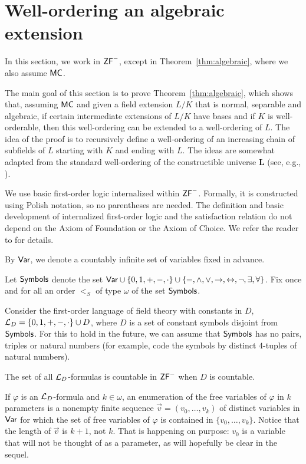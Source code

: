 \section{Well-ordering an algebraic extension}\label{sec:extension}

In this section, we work in $\mathsf{ZF}^{-}$, except in Theorem~\ref{thm:algebraic}, where we also assume $\mathsf{MC}$.

The main goal of this section is to prove Theorem~\ref{thm:algebraic}, which shows that, assuming $\mathsf{MC}$ and given a field extension $L/K$ that is normal, separable and algebraic, if certain intermediate extensions of $L/K$ have bases and if $K$ is well-orderable, then this well-ordering can be extended to a well-ordering of $L$.
The idea of the proof is to recursively define a well-ordering of an increasing chain of subfields of $L$ starting with $K$ and ending with $L$.
The ideas are somewhat adapted from the standard well-ordering of the constructible universe $\mathbf L$ (see, e.g., \cite[Definitions~II.6.18 and~II.6.19 and Theorem~II.6.20]{Kunen2011}).

We use basic first-order logic internalized within $\mathsf{ZF}^{-}$.
Formally, it is constructed using Polish notation, so no parentheses are needed.
The definition and basic development of internalized first-order logic and the satisfaction relation do not depend on the Axiom of Foundation or the Axiom of Choice.
We refer the reader to \cite[\S\S II.4--II.8]{Kunen2009} for details.

By $\mathsf{Var}$, we denote a countably infinite set of variables fixed in advance.

Let $\mathsf{Symbols}$ denote the set $\mathsf{Var}\cup\{0,1,+,-,\cdot\}\cup\{=,\land, \vee, \rightarrow, \leftrightarrow, \neg, \exists, \forall\}$.
Fix once and for all an order $<_S$ of type $\omega$ of the set $\mathsf{Symbols}$.

Consider the first-order language of field theory with constants in $D$, $\mathcal L_D=\{0,1,+,-,\cdot\}\cup D$, where $D$ is a set of constant symbols disjoint from $\mathsf{Symbols}$.
For this to hold in the future, we can assume that $\mathsf{Symbols}$ has no pairs, triples or natural numbers (for example, code the symbols by distinct $4$-tuples of natural numbers).

The set of all $\mathcal L_D$-formulas is countable in $\mathsf{ZF}^{-}$ when $D$ is countable.

If $\varphi$ is an $\mathcal L_D$-formula and $k \in \omega$, an enumeration of the free variables of $\varphi$ in $k$ parameters is a nonempty finite sequence $\vec v=(v_0,\ldots,v_k)$ of distinct variables in $\mathsf{Var}$ for which the set of free variables of $\varphi$ is contained in $\{v_0,\ldots,v_{k}\}$.
Notice that the length of $\vec v$ is $k+1$, not $k$.
That is happening on purpose: $v_0$ is a variable that will not be thought of as a parameter, as will hopefully be clear in the sequel.

